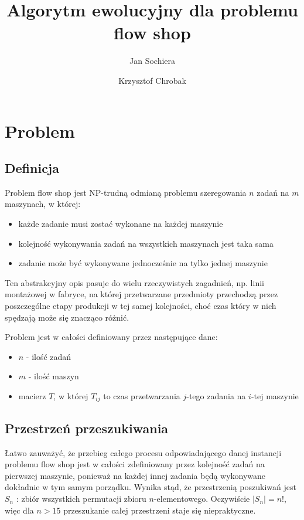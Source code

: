\documentclass[11pt, a4wide]{article}
\title{Algorytm ewolucyjny dla problemu flow shop}
\author{Jan Sochiera \and Krzysztof Chrobak}
\begin{document}
\maketitle
\tableofcontents

\section{Problem}
\subsection{Definicja}
Problem flow shop jest NP-trudną odmianą problemu szeregowania $n$ zadań na $m$ maszynach, w której:
\begin{itemize}
  \item każde zadanie musi zostać wykonane na każdej maszynie
  \item kolejność wykonywania zadań na wszystkich maszynach jest taka sama
  \item zadanie może być wykonywane jednocześnie na tylko jednej maszynie
\end{itemize}
Ten abstrakcyjny opis pasuje do wielu rzeczywistych zagadnień, np. linii montażowej w 
fabryce, na której przetwarzane przedmioty przechodzą przez poszczególne etapy produkcji w tej
samej kolejności, choć czas który w nich spędzają może się znacząco różnić.

Problem jest w całości definiowany przez następujące dane:
\begin{itemize}
  \item $n$ - ilość zadań
  \item $m$ - ilość maszyn 
  \item macierz $T$, w której $T_{ij}$ to czas przetwarzania $j$-tego zadania na $i$-tej maszynie
\end{itemize}

\subsection{Przestrzeń przeszukiwania}
Łatwo zauważyć, że przebieg całego procesu odpowiadającego danej instancji problemu flow shop
jest w całości zdefiniowany przez kolejność zadań na pierwszej maszynie, ponieważ na każdej innej
zadania będą wykonywane dokładnie w tym samym porządku. Wynika stąd, że przestrzenią poszukiwań jest
$S_n$ : zbiór wszystkich permutacji zbioru $n$-elementowego. Oczywiście $|S_n| = n!$, więc dla $n>15$
przeszukanie całej przestrzeni staje się niepraktyczne.
\end{document}
